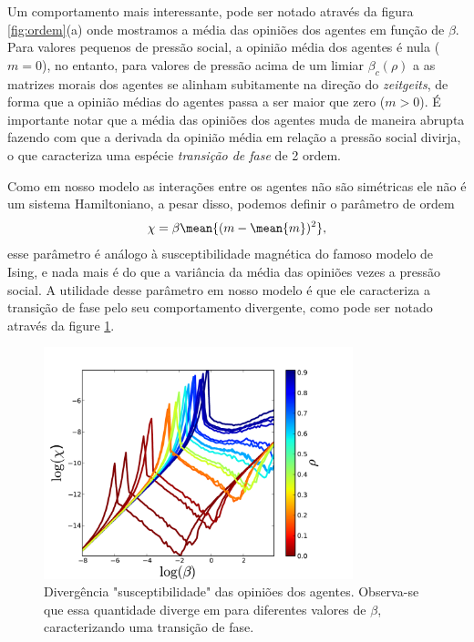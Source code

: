 Um comportamento mais interessante, pode ser notado através da figura
\ref{fig:ordem}(a) onde mostramos a média das opiniões dos agentes em
função de $\beta$. Para valores pequenos de pressão social, a opinião média
dos agentes é nula ($ m = 0$), no entanto, para valores de pressão acima
de um limiar $\beta_c(\rho)$ a as matrizes morais dos agentes se alinham
subitamente na direção do \textit{zeitgeits}, de forma que a opinião
médias do agentes passa a ser maior que zero ($m > 0$).  É importante notar
que a média das opiniões dos agentes muda de maneira abrupta fazendo com
que a derivada da opinião média em relação a pressão social divirja,
o que caracteriza uma espécie \textit{transição de fase} de 2 ordem.

Como em nosso modelo as interações entre os agentes não são simétricas ele não
é um sistema Hamiltoniano, a pesar disso, podemos definir o parâmetro de ordem
\begin{align}
    \chi = \beta\mean{(m - \mean{m})^2},
\end{align}
esse parâmetro é análogo à susceptibilidade magnética do famoso modelo
de Ising, e nada mais é do que a variância da média das opiniões vezes
a pressão social. A utilidade desse parâmetro em nosso modelo  é que
ele caracteriza a transição de fase pelo seu comportamento divergente,
como pode ser notado através da figure \ref{fig:chi}.
\begin{figure}
    \centering
    \includegraphics[width = 0.8\textwidth]{Figures/chi}
    \caption{Divergência "susceptibilidade" das opiniões dos agentes.
    Observa-se que essa quantidade diverge em para diferentes 
    valores de $\beta$, caracterizando uma transição de fase.
    }
    \label{fig:chi}
\end{figure}

